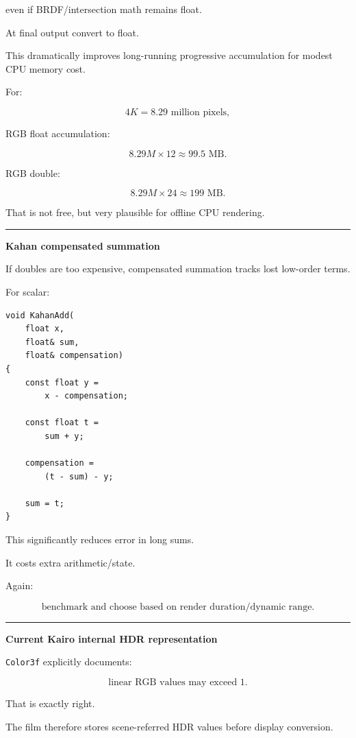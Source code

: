 even if BRDF/intersection math remains float.

At final output convert to float.

This dramatically improves long-running progressive accumulation for modest CPU memory cost.

For:

\[
4K
=
8.29\text{ million pixels},
\]

RGB float accumulation:

\[
8.29M\times12
\approx99.5\text{ MB}.
\]

RGB double:

\[
8.29M\times24
\approx199\text{ MB}.
\]

That is not free, but very plausible for offline CPU rendering.

\begin{center}\rule{0.5\linewidth}{0.5pt}\end{center}

\textbf{Kahan compensated summation}

If doubles are too expensive, compensated summation tracks lost low-order terms.

For scalar:

\begin{verbatim}
void KahanAdd(
    float x,
    float& sum,
    float& compensation)
{
    const float y =
        x - compensation;

    const float t =
        sum + y;

    compensation =
        (t - sum) - y;

    sum = t;
}
\end{verbatim}

This significantly reduces error in long sums.

It costs extra arithmetic/state.

Again:

\[
\boxed{\text{benchmark and choose based on render duration/dynamic range}.}
\]

\begin{center}\rule{0.5\linewidth}{0.5pt}\end{center}

\textbf{Current Kairo internal HDR representation}

\texttt{Color3f} explicitly documents:

\[
\boxed{\text{linear RGB values may exceed }1.}
\]

That is exactly right.

The film therefore stores scene-referred HDR values before display conversion.

